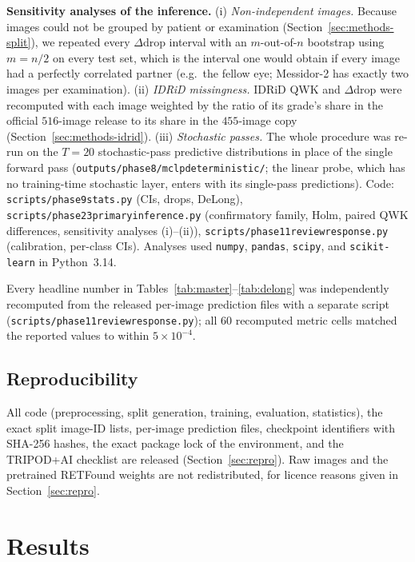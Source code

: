 \documentclass[journal]{IEEEtran}
\renewcommand{\_}{\origunderscore\allowbreak}
\begin{document}
\textbf{Sensitivity analyses of the inference.} (i) \emph{Non-independent
images.} Because images could not be grouped by patient or examination
(Section~\ref{sec:methods-split}), we repeated every $\Delta$drop interval with
an $m$-out-of-$n$ bootstrap using $m=n/2$ on every test set, which is the
interval one would obtain if every image had a perfectly correlated partner
(e.g.\ the fellow eye; Messidor-2 has exactly two images per examination). (ii)
\emph{IDRiD missingness.} IDRiD QWK and $\Delta$drop were recomputed with each
image weighted by the ratio of its grade's share in the official $516$-image
release to its share in the $455$-image copy (Section~\ref{sec:methods-idrid}).
(iii) \emph{Stochastic passes.} The whole procedure was re-run on the $T=20$
stochastic-pass predictive distributions in place of the single forward pass
(\texttt{outputs/\allowbreak{}phase8/\allowbreak{}mc\_lp\_deterministic/}; the linear
probe, which has no training-time stochastic layer, enters with its single-pass
predictions).
Code: \texttt{scripts/\allowbreak{}phase9\_stats.py} (CIs, drops, DeLong),
\texttt{scripts/\allowbreak{}phase23\_primary\_inference.py} (confirmatory family,
Holm, paired QWK differences, sensitivity analyses (i)--(ii)),
\texttt{scripts/\allowbreak{}phase11\_review\_response.py} (calibration, per-class
CIs). Analyses used \texttt{numpy}, \texttt{pandas}, \texttt{scipy}, and
\texttt{scikit-learn} in Python~3.14.

Every headline number in Tables~\ref{tab:master}--\ref{tab:delong} was
independently recomputed from the released per-image prediction files with a
separate script (\texttt{scripts/\allowbreak{}phase11\_review\_response.py}); all $60$
recomputed metric cells matched the reported values to within $5\times10^{-4}$.

\subsection{Reproducibility}
\label{sec:methods-repro}

All code (preprocessing, split generation, training, evaluation, statistics), the
exact split image-ID lists, per-image prediction files, checkpoint identifiers
with SHA-256 hashes, the exact package lock of the environment, and the
TRIPOD+AI checklist are released (Section~\ref{sec:repro}). Raw images and the
pretrained RETFound weights are not redistributed, for licence reasons given in
Section~\ref{sec:repro}.


\section{Results}
\label{sec:results}
\end{document}
